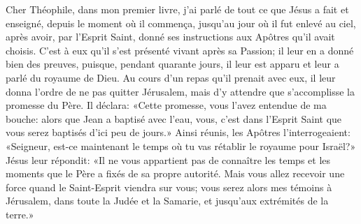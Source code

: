 Cher Théophile, dans mon premier livre,
	j’ai parlé de tout ce que Jésus a fait et enseigné,
	depuis le moment où il commença,
	jusqu’au jour où il fut enlevé au ciel, après avoir, par l’Esprit Saint,
	donné ses instructions aux Apôtres qu’il avait choisis.
C’est à eux qu’il s’est présenté vivant après sa Passion;
	il leur en a donné bien des preuves, puisque, pendant quarante jours,
	il leur est apparu et leur a parlé du royaume de Dieu.
Au cours d’un repas qu’il prenait avec eux,
	il leur donna l’ordre de ne pas quitter Jérusalem,
	mais d’y attendre que s’accomplisse la promesse du Père.
Il déclara: «Cette promesse, vous l’avez entendue de ma bouche:
	alors que Jean a baptisé avec l’eau,
	vous, c’est dans l’Esprit Saint que vous serez baptisés d’ici peu de jours.»
Ainsi réunis, les Apôtres l’interrogeaient:
	«Seigneur, est-ce maintenant le temps
		où tu vas rétablir le royaume pour Israël?»
Jésus leur répondit: «Il ne vous appartient pas de connaître
		les temps et les moments que le Père a fixés de sa propre autorité.
Mais vous allez recevoir une force quand le Saint-Esprit viendra sur vous;
	vous serez alors mes témoins à Jérusalem,
	dans toute la Judée et la Samarie, et jusqu’aux extrémités de la terre.»

